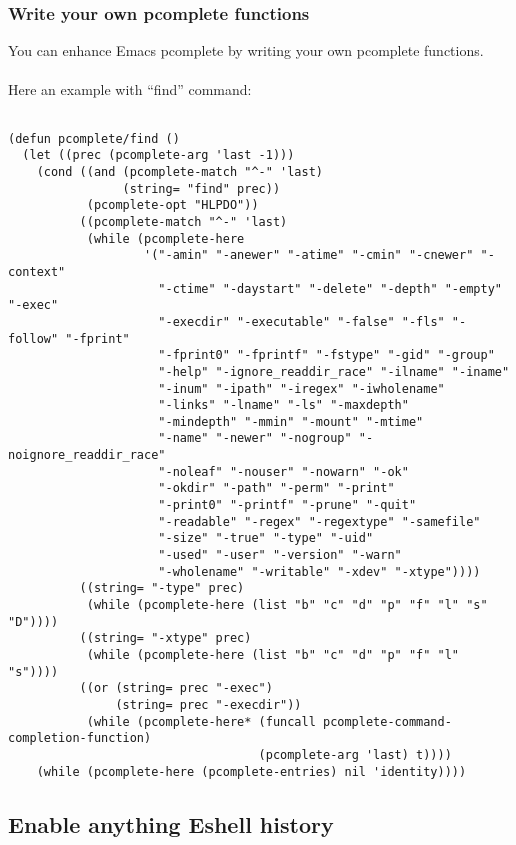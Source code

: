 \documentclass[a4paper,11pt]{article}
\begin{document}
\subsubsection{Write your own pcomplete functions}
\label{sec:write-your-own}

You can enhance Emacs pcomplete by writing your own pcomplete functions.\\
\\
Here an example with ``find'' command:

\begin{verbatim}
  
(defun pcomplete/find ()
  (let ((prec (pcomplete-arg 'last -1)))
    (cond ((and (pcomplete-match "^-" 'last)
                (string= "find" prec))
           (pcomplete-opt "HLPDO"))
          ((pcomplete-match "^-" 'last)
           (while (pcomplete-here
                   '("-amin" "-anewer" "-atime" "-cmin" "-cnewer" "-context"
                     "-ctime" "-daystart" "-delete" "-depth" "-empty" "-exec"
                     "-execdir" "-executable" "-false" "-fls" "-follow" "-fprint"
                     "-fprint0" "-fprintf" "-fstype" "-gid" "-group"
                     "-help" "-ignore_readdir_race" "-ilname" "-iname"
                     "-inum" "-ipath" "-iregex" "-iwholename"
                     "-links" "-lname" "-ls" "-maxdepth"
                     "-mindepth" "-mmin" "-mount" "-mtime"
                     "-name" "-newer" "-nogroup" "-noignore_readdir_race"
                     "-noleaf" "-nouser" "-nowarn" "-ok"
                     "-okdir" "-path" "-perm" "-print"
                     "-print0" "-printf" "-prune" "-quit"
                     "-readable" "-regex" "-regextype" "-samefile"
                     "-size" "-true" "-type" "-uid"
                     "-used" "-user" "-version" "-warn"
                     "-wholename" "-writable" "-xdev" "-xtype"))))
          ((string= "-type" prec)
           (while (pcomplete-here (list "b" "c" "d" "p" "f" "l" "s" "D"))))
          ((string= "-xtype" prec)
           (while (pcomplete-here (list "b" "c" "d" "p" "f" "l" "s"))))
          ((or (string= prec "-exec")
               (string= prec "-execdir"))
           (while (pcomplete-here* (funcall pcomplete-command-completion-function)
                                   (pcomplete-arg 'last) t))))
    (while (pcomplete-here (pcomplete-entries) nil 'identity))))

\end{verbatim}
\newpage
\subsection{Enable anything Eshell history}
\label{sec:enable-anyth-eshell}
\end{document}
